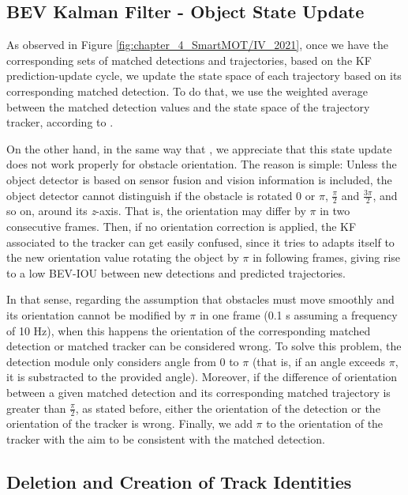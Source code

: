 \subsection{BEV Kalman Filter - Object State Update}
\label{subsec:4_smartmot_data_state_update}

As observed in Figure \ref{fig:chapter_4_SmartMOT/IV_2021}, once we have the corresponding sets of matched detections and trajectories, based on the \ac{KF} prediction-update cycle, we update the state space of each trajectory based on its corresponding matched detection. To do that, we use the weighted average between the matched detection values and the state space of the trajectory tracker, according to \cite{kalman1960new}. 

On the other hand, in the same way that \cite{weng20203d}, we appreciate that this state update does not work properly for obstacle orientation. The reason is simple: Unless the object detector is based on sensor fusion and vision information is included, the object detector cannot distinguish if the obstacle is rotated 0 or $\pi$, $\frac{\pi}{2}$ and $\frac{3\pi}{2}$, and so on, around its \textit{z}-axis. That is, the orientation may differ by $\pi$ in two consecutive frames. Then, if no orientation correction is applied, the \ac{KF} associated to the tracker can get easily confused, since it tries to adapts itself to the new orientation value rotating the object by $\pi$ in following frames, giving rise to a low \ac{BEV}-\ac{IOU} between new detections and predicted trajectories. 

In that sense, regarding the assumption that obstacles must move smoothly and its orientation cannot be modified by $\pi$ in one frame (0.1 s assuming a frequency of 10 Hz), when this happens the orientation of the corresponding matched detection or matched tracker can be considered wrong. To solve this problem, the detection module only considers angle from 0 to $\pi$ (that is, if an angle exceeds $\pi$, it is substracted to the provided angle). Moreover, if the difference of orientation between a given matched detection and its corresponding matched trajectory is greater than $\frac{\pi}{2}$, as stated before, either the orientation of the detection or the orientation of the tracker is wrong. Finally, we add $\pi$ to the orientation of the tracker with the aim to be consistent with the matched detection. 

\subsection{Deletion and Creation of Track Identities}
\label{subsec:4_smartmot_data_deletion_creation}


